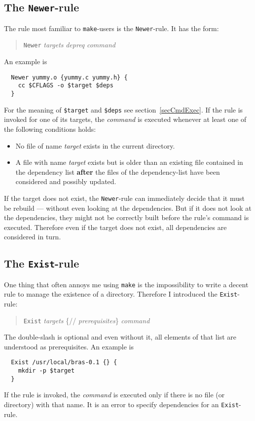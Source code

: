 \documentclass[12pt]{article}
\newcommand{\make}{\texttt{make}}
\begin{document}
\subsection{The \texttt{Newer}-rule}
\label{secNewer}
The rule most familiar to \make-users is the
\texttt{Newer}-rule. It has the form:
\begin{quote}
  \texttt{Newer} \textit{targets} \textit{depreq} \textit{command}
\end{quote}
An example is
\begin{verbatim}
  Newer yummy.o {yummy.c yummy.h} {
    cc $CFLAGS -o $target $deps
  }
\end{verbatim}
For the meaning of \texttt{\$target} and \texttt{\$deps} see
section~\ref{secCmdExec}. If the rule is invoked for one of its
targets, the \textit{command} is executed whenever at least one of the
following conditions holds:
\begin{itemize}
\item No file of name \textit{target} exists in the current directory.
\item A file with name \textit{target} exists but is older than an
existing file contained in the dependency list \textbf{after} the
files of the dependency-list have been considered and possibly
updated.
\end{itemize}

If the target does not exist, the \texttt{Newer}-rule can immediately
decide that it must be rebuild --- without even looking at the
dependencies. But if it does not look at the dependencies, they might
not be correctly built before the rule's command is
executed. Therefore even if the target does not exist, all
dependencies are considered in turn.

\subsection{The \texttt{Exist}-rule}

One thing that often annoys me using \make{} is the impossibility to
write a decent rule to manage the existence of a directory. Therefore
I introduced the \texttt{Exist}-rule:
\begin{quote}
  \texttt{Exist} \textit{targets} \{// \textit{prerequisites}\} \textit{command}
\end{quote}
The double-slash is optional and even without it, all elements of that
list are understood as prerequisites.  An example is
\begin{verbatim}
  Exist /usr/local/bras-0.1 {} {
    mkdir -p $target
  }
\end{verbatim}
If the rule is invoked, the \textit{command} is executed only if
there is no file (or directory) with that name.  It is an error to
specify dependencies for an \texttt{Exist}-rule.
\end{document}
